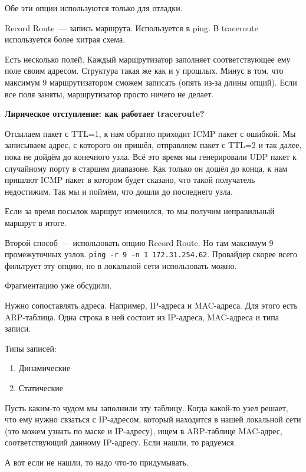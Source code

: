 \begin{MyItemize}
    Обе эти опции используются только для отладки.

    \item Record Route~--- запись маршрута. Используется в ping. В traceroute используется более хитрая схема.

    Есть несколько полей. Каждый маршрутизатор заполняет соответствующее ему поле своим адресом. Структура такая же как и у прошлых. Минус в том, что максимум 9 маршрутизатором сможем записать (опять из-за длины опций). Если все поля заняты, маршрутизатор просто ничего не делает.
\end{MyItemize}

{\bf Лирическое отступление: как работает traceroute?}

Отсылаем пакет с TTL=1, к нам обратно приходит ICMP пакет с ошибкой. Мы записываем адрес, с которого он пришёл, отправляем пакет с TTL=2 и так далее, пока не дойдём до конечного узла. Всё это время мы генерировали UDP пакет к случайному порту в старшем диапазоне. Как только он дошёл до конца, к нам пришлют ICMP пакет в котором будет сказано, что такой получатель недостижим. Так мы и поймём, что дошли до последнего узла.

Если за время посылок маршрут изменился, то мы получим неправильный маршрут в итоге.

Второй способ~--- использовать опцию Record Route. Но там максимум 9 промежуточных узлов. {\tt ping -r 9 -n 1 172.31.254.62}. Провайдер скорее всего фильтрует эту опцию, но в локальной сети использовать можно.


Фрагментацию уже обсудили.

Нужно сопоставлять адреса. Например, IP-адреса и MAC-адреса. Для этого есть ARP-таблица. Одна строка в ней состоит из IP-адреса, MAC-адреса и типа записи. 

Типы записей:
\begin{enumerate}
    \item Динамические
    \item Статические
\end{enumerate}

Пусть каким-то чудом мы заполнили эту таблицу. Когда какой-то узел решает, что ему нужно свзаться с IP-адресом, который находится в нашей локальной сети (это можем узнать по маске и IP-адресу), ищем в ARP-таблице MAC-адрес, соответствующий данному IP-адресу. Если нашли, то радуемся. 

А вот если не нашли, то надо что-то придумывать.

